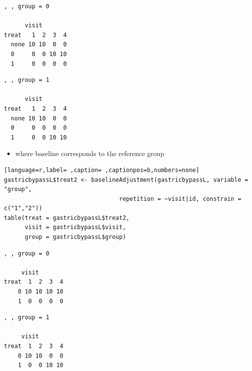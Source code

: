 \documentclass[12pt]{article}
\begin{document}
\begin{minipage}{0.45\linewidth}
\begin{verbatim}
, , group = 0

      visit
treat   1  2  3  4
  none 10 10  0  0
  0     0  0 10 10
  1     0  0  0  0
\end{verbatim}

\end{minipage}
\begin{minipage}{0.05\linewidth}
\hphantom{x}
\end{minipage}
\begin{minipage}{0.45\linewidth}
\begin{verbatim}
, , group = 1

      visit
treat   1  2  3  4
  none 10 10  0  0
  0     0  0  0  0
  1     0  0 10 10
\end{verbatim}


\end{minipage}


\begin{itemize}
\item where baseline corresponds to the reference group
\end{itemize}
\begin{lstlisting}[language=r,label= ,caption= ,captionpos=b,numbers=none]
gastricbypassL$treat2 <- baselineAdjustment(gastricbypassL, variable = "group",
                                 repetition = ~visit|id, constrain = c("1","2"))
table(treat = gastricbypassL$treat2,
      visit = gastricbypassL$visit,
      group = gastricbypassL$group)
\end{lstlisting}

\begin{minipage}{0.45\linewidth}
\begin{verbatim}
, , group = 0

     visit
treat  1  2  3  4
    0 10 10 10 10
    1  0  0  0  0
\end{verbatim}

\end{minipage}
\begin{minipage}{0.05\linewidth}
\hphantom{x}
\end{minipage}
\begin{minipage}{0.45\linewidth}
\begin{verbatim}
, , group = 1

     visit
treat  1  2  3  4
    0 10 10  0  0
    1  0  0 10 10
\end{verbatim}


\end{minipage}
\end{document}
